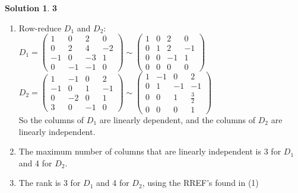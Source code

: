 \documentclass[11pt]{article}
\theoremstyle{definition}
\theoremstyle{nopunct}
\newtheorem*{s}{Solution}
\begin{document}
\begin{s}\textbf{3}
    \begin{enumerate} 
        \item Row-reduce $D_1$ and $D_2$: \bigskip\\
        $
            D_1 =
            \begin{pmatrix}
                1 & 0 & 2 & 0 \\ 
                0 & 2 & 4 & -2 \\ 
                -1 & 0 & -3 & 1 \\ 
                0 & -1 & -1 & 0
            \end{pmatrix} \sim
            \begin{pmatrix}
                1 & 0 & 2 & 0 \\ 
                0 & 1 & 2 & -1 \\ 
                0 & 0 & -1 & 1 \\ 
                0 & 0 & 0 & 0
            \end{pmatrix}
        $
        \bigskip\\
        $
            D_2 =
            \begin{pmatrix}
                1 & -1 & 0 & 2 \\ 
                -1 & 0 & 1 & -1 \\ 
                0 & -2 & 0 & 1 \\ 
                3 & 0 & -1 & 0
            \end{pmatrix} \sim
            \begin{pmatrix}
                1 & -1 & 0 & 2 \\ 
                0 & 1 & -1 & -1 \\ 
                0 & 0 & 1 & \frac{3}{2} \\ 
                0 & 0 & 0 & 1
            \end{pmatrix}
        $
        \bigskip\\
        So the columns of $D_1$ are linearly dependent, and
        the columns of $D_2$ are linearly independent.

        \item The maximum number of columns that are linearly
            independent is 3 for $D_1$ and 4 for $D_2$.

        \item The rank is 3 for $D_1$ and 4 for $D_2$, using
            the RREF's found in (1)


\end{enumerate}
\end{s}
\end{document}
